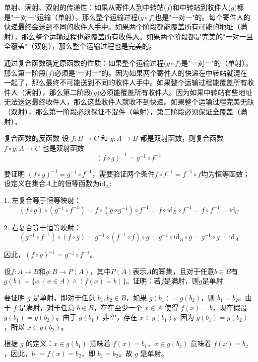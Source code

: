 单射、满射、双射的传递性：如果从寄件人到中转站($f$)和中转站到收件人($g$)都是"一对一"运输（单射），那么整个运输过程($g \circ f$)也是"一对一"的。每个寄件人的快递最终会送到不同的收件人手中。如果两个阶段都能覆盖所有可能的地址（满射），那么整个运输过程也能覆盖所有收件人。如果两个阶段都是完美的"一对一且全覆盖"（双射），那么整个运输过程也是完美的。

通过复合函数确定原函数的性质：如果整个运输过程($g \circ f$)是"一对一"的（单射），那么第一阶段($f$)必须是"一对一"的。因为如果两个寄件人的快递在中转站就混在一起了，那么最终不可能送到不同的收件人手中。如果整个运输过程能覆盖所有收件人（满射），那么第二阶段($g$)必须能覆盖所有收件人。因为如果中转站有些地址无法送达最终收件人，那么这些收件人就收不到快递。如果整个运输过程完美无缺（双射），那么第一阶段必须保证不混件（单射），第二阶段必须保证全覆盖（满射）。
\begin{theorem}{复合函数的反函数}{}
设 $f: B \to C$ 和 $g: A \to B$ 都是双射函数，则复合函数 $f \circ g: A \to C$ 也是双射函数\vspace{-10pt}
\[(f \circ g)^{-1} = g^{-1} \circ f^{-1}\]
\end{theorem}
要证明 $(f \circ g)^{-1} = g^{-1} \circ f^{-1}$，需要验证两个条件$f\circ f^{-1}=f^{-1}\circ f$均为恒等函数；设定义在集合$A$上的恒等函数为$\text{id}_A$:

1. 左复合等于恒等映射：
\[
(f \circ g) \circ (g^{-1} \circ f^{-1}) = f \circ (g \circ g^{-1}) \circ f^{-1} = f \circ \text{id}_B \circ f^{-1} = f \circ f^{-1} = \text{id}_C
\]

2. 右复合等于恒等映射：
\[
(g^{-1} \circ f^{-1}) \circ (f \circ g) = g^{-1} \circ (f^{-1} \circ f) \circ g = g^{-1} \circ \text{id}_B \circ g = g^{-1} \circ g = \text{id}_A
\]

因此，$(f \circ g)^{-1} = g^{-1} \circ f^{-1}$。
\begin{example}{}{}
    设$f:A\to B$和$g:B\to P(A)$，其中$P(A)$表示$A$的幂集，且对于任意$b\in B$有$g(b)=\{x|(x\in A)\land(f(x)=b)\}$。证明：若$f$是满射，则$g$是单射
\end{example}
要证明 $g$ 是单射，即对于任意 $b_1, b_2 \in B$，如果 $g(b_1) = g(b_2)$，则 $b_1 = b_2$。由于 $f$ 是满射，对于任意 $b \in B$，存在至少一个 $x \in A$ 使得 $f(x) = b$，现在假设 $g(b_1) = g(b_2)$。由于 $g(b_1)$ 非空，存在 $x \in g(b_1)$。因为 $g(b_1) = g(b_2)$，所以 $x \in g(b_2)$。

根据 $g$ 的定义：$x \in g(b_1)$ 意味着 $f(x) = b_1$，$x \in g(b_2)$ 意味着 $f(x) = b_2$，因此，$b_1 = f(x) = b_2$，即 $b_1 = b_2$。故 $g$ 是单射。


